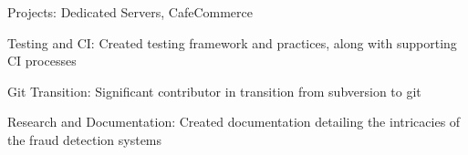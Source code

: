 \item Projects: Dedicated Servers, CafeCommerce
\item Testing and CI: Created testing framework and practices, along with supporting CI processes   
\item Git Transition: Significant contributor in transition from subversion to git   
\item Research and Documentation: Created documentation detailing the intricacies of the fraud detection systems
